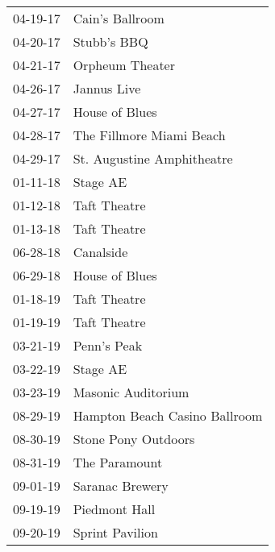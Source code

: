 \begin{supertabular}{p{0.07\textwidth}p{0.23\textwidth}}
 04-19-17 &                Cain's Ballroom \\
 04-20-17 &                    Stubb's BBQ \\
 04-21-17 &                Orpheum Theater \\
 04-26-17 &                    Jannus Live \\
 04-27-17 &                 House of Blues \\
 04-28-17 &       The Fillmore Miami Beach \\
 04-29-17 &     St. Augustine Amphitheatre \\
 01-11-18 &                       Stage AE \\
 01-12-18 &                   Taft Theatre \\
 01-13-18 &                   Taft Theatre \\
 06-28-18 &                      Canalside \\
 06-29-18 &                 House of Blues \\
 01-18-19 &                   Taft Theatre \\
 01-19-19 &                   Taft Theatre \\
 03-21-19 &                    Penn's Peak \\
 03-22-19 &                       Stage AE \\
 03-23-19 &             Masonic Auditorium \\
 08-29-19 &  Hampton Beach Casino Ballroom \\
 08-30-19 &            Stone Pony Outdoors \\
 08-31-19 &                  The Paramount \\
 09-01-19 &                Saranac Brewery \\
 09-19-19 &                  Piedmont Hall \\
 09-20-19 &                Sprint Pavilion \\
\end{supertabular}
